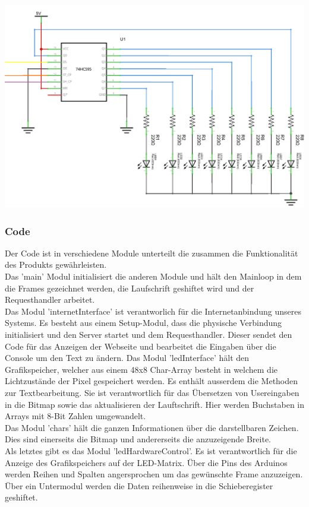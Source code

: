 \documentclass[10pt,a4paper]{article}
\begin{document}
\includegraphics[width=\textwidth]{shiftReg.png}

\subsubsection{Code}

Der Code ist in verschiedene Module unterteilt die zusammen die Funktionalität des Produkts gewährleisten.\\
Das 'main' Modul initialisiert die anderen Module und hält den Mainloop in dem die Frames gezeichnet werden, die Laufschrift geshiftet wird und der Requesthandler arbeitet.\\
Das Modul 'internetInterface' ist verantworlich für die Internetanbindung unseres Systems. Es besteht aus einem Setup-Modul, dass die physische Verbindung initialisiert und den Server startet und dem Requesthandler. Dieser sendet den Code für das Anzeigen der Webseite und bearbeitet die Eingaben über die Console um den Text zu ändern. 
Das Modul 'ledInterface' hält den Grafikspeicher, welcher aus einem 48x8 Char-Array besteht in welchem die Lichtzustände der Pixel gespeichert werden. Es enthält ausserdem die Methoden zur Textbearbeitung. Sie ist verantwortlich für das Übersetzen von Usereingaben in die Bitmap sowie das aktualisieren der Lauftschrift. Hier werden Buchstaben in Arrays mit 8-Bit Zahlen umgewandelt.\\
Das Modul 'chars' hält die ganzen Informationen über die darstellbaren Zeichen. Dies sind einerseits die Bitmap und andererseits die anzuzeigende Breite.\\
Als letztes gibt es das Modul 'ledHardwareControl'. Es ist verantwortlich für die Anzeige des Grafikspeichers auf der LED-Matrix. Über die Pins des Arduinos werden Reihen und Spalten angersprochen um das gewünschte Frame anzuzeigen. Über ein Untermodul werden die Daten reihenweise in die Schieberegister geshiftet.\\
\end{document}
